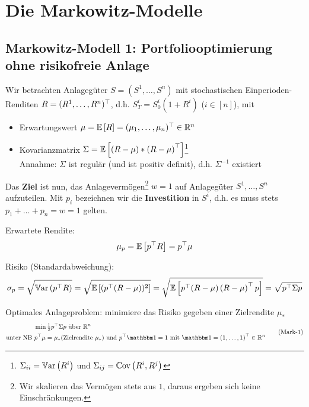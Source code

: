 \section{Die Markowitz-Modelle}

\subsection{Markowitz-Modell 1: Portfoliooptimierung ohne risikofreie Anlage}

Wir betrachten Anlagegüter $S = (S^1, \dots, S^n)$ mit stochastischen Einperioden-Renditen $R=\trans{(R^1, \dots, R^n)}$, d.h. $S_T^i = S_0^i (1+R^i)$ ($i \in [n]$), mit
\begin{itemize}
	\item Erwartungswert $\mu = \EW[R] = \trans{(\mu_1, \dots, \mu_n)} \in \Rn$
	\item Kovarianzmatrix $\Sigma = \EW[(R - \mu) * \transpose{R - \mu}]$\footnote{$\Sigma_{ii} = \Var[R^i]$ und $\Sigma_{ij} = \Cov{R^i}{R^j}$} \\
	Annahme: $\Sigma$ ist regulär (und ist positiv definit), d.h. $\Sigma^{-1}$ existiert
\end{itemize}

Das \textbf{Ziel} ist nun, das Anlagevermögen\footnote{Wir skalieren das Vermögen stets aus $1$, daraus ergeben sich keine Einschränkungen.} $w=1$ auf Anlagegüter $S^1, \dots, S^n$ aufzuteilen. 
Mit $p_i$ bezeichnen wir die \textbf{Investition} in $S^i$, d.h. es muss stets $p_1 + \dots + p_n = w = 1$ gelten.

Erwartete Rendite:
\begin{equation*}
	\mu_p = \EW[\trans{p} R] = \trans{p} \mu
\end{equation*}

Risiko (Standardabweichung): 
\begin{equation*}
	\sigma_p = \sqrt{\Var[\trans{p}R]} = \sqrt{\EW[(\trans{p} (R-\mu))^2]} = \sqrt{\EW[\trans{p}(R-\mu)\transpose{R-\mu} p]} = \sqrt{\trans{p} \Sigma p}
\end{equation*}

Optimales Anlageproblem:
minimiere das Risiko gegeben einer Zielrendite $\mu_\ast$
\begin{equation*}
	\begin{aligned}
	&\min \tfrac{1}{2} \trans{p} \Sigma p \text{ über } \Rn  \\
	\text{unter NB } &\trans{p} \mu = \mu_\ast (\text{Zielrendite } \mu_\ast) \und \trans{p} \one = 1 \mit \one = \transpose{1, \dots, 1} \in \Rn
	\end{aligned}
	\tag{Mark-1} \label{eq: mark-1}
\end{equation*}

